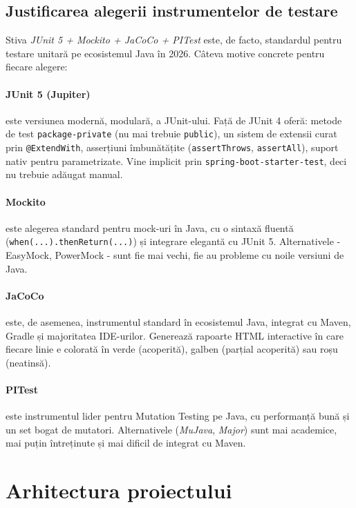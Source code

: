 \subsection{Justificarea alegerii instrumentelor de testare}

Stiva \textit{JUnit 5 + Mockito + JaCoCo + PITest} este, de facto, standardul pentru testare unitară pe ecosistemul Java în 2026. Câteva motive concrete pentru fiecare alegere:

\paragraph{JUnit 5 (Jupiter)} este versiunea modernă, modulară, a JUnit-ului. Față de JUnit 4 oferă: metode de test \texttt{package-private} (nu mai trebuie \texttt{public}), un sistem de extensii curat prin \texttt{@ExtendWith}, asserțiuni îmbunătățite (\texttt{assertThrows}, \texttt{assertAll}), suport nativ pentru parametrizate. Vine implicit prin \texttt{spring-boot-starter-test}, deci nu trebuie adăugat manual.

\paragraph{Mockito} este alegerea standard pentru mock-uri în Java, cu o sintaxă fluentă (\texttt{when(...).thenReturn(...)}) și integrare elegantă cu JUnit 5. Alternativele - EasyMock, PowerMock - sunt fie mai vechi, fie au probleme cu noile versiuni de Java.

\paragraph{JaCoCo} este, de asemenea, instrumentul standard în ecosistemul Java, integrat cu Maven, Gradle și majoritatea IDE-urilor. Generează rapoarte HTML interactive în care fiecare linie e colorată în verde (acoperită), galben (parțial acoperită) sau roșu (neatinsă).

\paragraph{PITest} este instrumentul lider pentru Mutation Testing pe Java, cu performanță bună și un set bogat de mutatori. Alternativele (\textit{MuJava}, \textit{Major}) sunt mai academice, mai puțin întreținute și mai dificil de integrat cu Maven.

\section{Arhitectura proiectului}

